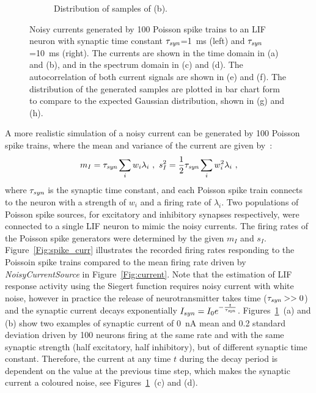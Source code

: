 \begin{figure}[tbp!]
\begin{subfigure}[t]{0.43\textwidth}
			\caption{Distribution of samples of (b).}
		\end{subfigure}
		\caption[Noisy currents generated by Poisson spike trains.]{Noisy currents generated by 100 Poisson spike trains to an LIF neuron with synaptic time constant $\tau_{\textit{\textrm{syn}}}$=1~ms (left) and $\tau_{\textit{\textrm{syn}}}$=10~ms (right). The currents are shown in the time domain in (a) and (b), and in the spectrum domain in (c) and (d). The autocorrelation of both current signals are shown in (e) and (f). The distribution of the generated samples are plotted in bar chart form to compare to the expected Gaussian distribution, shown in (g) and (h).}
		\label{Fig:lif_pois}
	\end{figure}

	A more realistic simulation of a noisy current can be generated by 100 Poisson spike trains, 
	where the mean and variance of the current are given by~\citep{la2008response}:
	\begin{equation}
	m_I = \tau_{\textit{\textrm{syn}}}\sum_i w_i\lambda_{i}~, ~s_I^2=\frac{1}{2}\tau_{\textit{\textrm{syn}}}\sum_i w_i^2\lambda_{i}~,
	\label{equ:distr0}
	\end{equation}
	where $\tau_{\textit{\textrm{syn}}}$ is the synaptic time constant, and each Poisson spike train connects to the neuron with a strength of $w_i$ and a firing rate of $\lambda_i$.
	Two populations of Poisson spike sources, for excitatory and inhibitory synapses respectively, were connected to a single LIF neuron to mimic the noisy currents.
	The firing rates of the Poisson spike generators were determined by the given $m_I$ and $s_I$.
	Figure~\ref{Fig:spike_curr} illustrates the recorded firing rates responding to the Poissoin spike trains compared to the mean firing rate driven by \textit{NoisyCurrentSource} in Figure~\ref{Fig:current}.
	Note that the estimation of LIF response activity using the Siegert function requires noisy current with white noise, however
	in practice the release of neurotransmitter takes time ($\tau_{\textit{\textrm{syn}}} >> 0$) and the synaptic current decays exponentially $I_{syn} = I_0 e^{-\frac{t}{\tau_{\textit{\textrm{syn}}}}}$.
	Figures~\ref{Fig:lif_pois}~(a) and (b) show two examples of synaptic current of 0~nA mean and 0.2 standard deviation driven by 100 neurons firing at the same rate and with the same synaptic strength (half excitatory, half inhibitory), but of different synaptic time constant.
	Therefore, the current at any time $t$ during the decay period is dependent on the value at the previous time step, which makes the synaptic current a coloured noise, see Figures~\ref{Fig:lif_pois}~(c) and (d).
	

